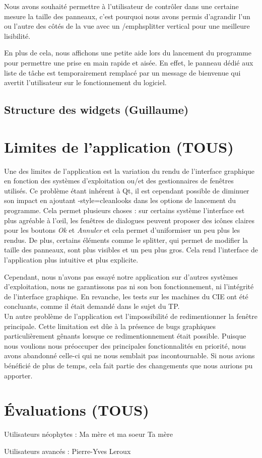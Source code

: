 		Nous avons souhaité permettre à l'utilisateur de contrôler dans une certaine mesure la taille des panneaux, c'est pourquoi nous avons permis d'agrandir l'un ou l'autre des côtés de la vue avec un /emph{splitter} vertical pour une meilleure lisibilité.
		
		En plus de cela, nous affichons une petite aide lors du lancement du programme pour permettre une prise en main rapide et aisée. En effet, le panneau dédié aux liste de tâche est temporairement remplacé par un message de bienvenue qui avertit l'utilisateur sur le fonctionnement du logiciel.
		
		
	\section{Structure des widgets (Guillaume)}
		
		
	
\chapter{Limites de l'application (TOUS)}
	Une des limites de l'application est la variation du rendu de l'interface graphique en fonction des systèmes d'exploitation ou/et des gestionnaires de fenêtres utilisés. Ce problème étant inhérent à Qt, il est cependant possible de diminuer son impact en ajoutant \og -style=cleanlooks \fg dans les options de lancement du programme. Cela permet plusieurs choses : sur certains système l'interface est plus agréable à l'{\oe}il, les fenêtres de dialogues peuvent proposer des icônes claires pour les boutons \emph{Ok} et \emph{Annuler} et cela permet d'uniformiser un peu plus les rendus. De plus, certains éléments comme le splitter, qui permet de modifier la taille des panneaux, sont plus visibles et un peu plus gros. Cela rend l'interface de l'application plus intuitive et plus explicite.
	
	Cependant, nous n'avons pas essayé notre application sur d'autres systèmes d'exploitation, nous ne garantissons pas ni son bon fonctionnement, ni l'intégrité de l'interface graphique. En revanche, les tests sur les machines du CIE ont été concluants, comme il était demandé dans le sujet du TP.\\
	
	 Un autre problème de l'application est l'impossibilité de redimentionner la fenêtre principale. Cette limitation est dûe à la présence de bugs graphiques particulièrement gênants lorsque ce redimentionnement était possible. Puisque nous voulions nous préoccuper des principales fonctionnalités en priorité, nous avons abandonné celle-ci qui ne nous semblait pas incontournable. Si nous avions bénéficié de plus de temps, cela fait partie des changements que nous aurions pu apporter.\\
	
	
	


\chapter{Évaluations (TOUS)}
	
	Utilisateurs néophytes :
		Ma mère et ma soeur
		Ta mère
		
	Utilisateurs avancés :
		Pierre-Yves
		Leroux

